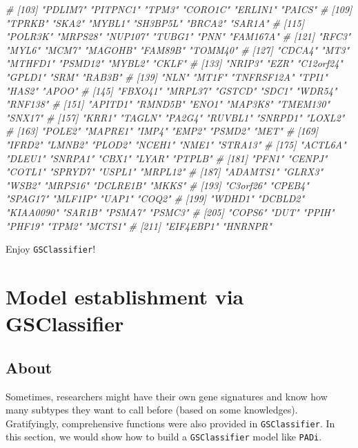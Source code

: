 \documentclass[
  12pt,
]{book}
\newenvironment{Shaded}{\begin{snugshade}}{\end{snugshade}}
\newcommand{\CommentTok}[1]{\textcolor[rgb]{0.56,0.35,0.01}{\textit{#1}}}
\begin{document}
\begin{Shaded}
\begin{Highlighting}[]
\CommentTok{\# [103] "PDLIM7"    "PITPNC1"   "TPM3"      "CORO1C"    "ERLIN1"    "PAICS"    }
\CommentTok{\# [109] "TPRKB"     "SKA2"      "MYBL1"     "SH3BP5L"   "BRCA2"     "SAR1A"    }
\CommentTok{\# [115] "POLR3K"    "MRPS28"    "NUP107"    "TUBG1"     "PNN"       "FAM167A"  }
\CommentTok{\# [121] "RFC3"      "MYL6"      "MCM7"      "MAGOHB"    "FAM89B"    "TOMM40"   }
\CommentTok{\# [127] "CDCA4"     "MT3"       "MTHFD1"    "PSMD12"    "MYBL2"     "CKLF"     }
\CommentTok{\# [133] "NRIP3"     "EZR"       "C12orf24"  "GPLD1"     "SRM"       "RAB3B"    }
\CommentTok{\# [139] "NLN"       "MT1F"      "TNFRSF12A" "TPI1"      "HAS2"      "APOO"     }
\CommentTok{\# [145] "FBXO41"    "MRPL37"    "GSTCD"     "SDC1"      "WDR54"     "RNF138"   }
\CommentTok{\# [151] "APITD1"    "RMND5B"    "ENO1"      "MAP3K8"    "TMEM130"   "SNX17"    }
\CommentTok{\# [157] "KRR1"      "TAGLN"     "PA2G4"     "RUVBL1"    "SNRPD1"    "LOXL2"    }
\CommentTok{\# [163] "POLE2"     "MAPRE1"    "IMP4"      "EMP2"      "PSMD2"     "MET"      }
\CommentTok{\# [169] "IFRD2"     "LMNB2"     "PLOD2"     "NCEH1"     "NME1"      "STRA13"   }
\CommentTok{\# [175] "ACTL6A"    "DLEU1"     "SNRPA1"    "CBX1"      "LYAR"      "PTPLB"    }
\CommentTok{\# [181] "PFN1"      "CENPJ"     "COTL1"     "SPRYD7"    "USPL1"     "MRPL12"   }
\CommentTok{\# [187] "ADAMTS1"   "GLRX3"     "WSB2"      "MRPS16"    "DCLRE1B"   "MKKS"     }
\CommentTok{\# [193] "C3orf26"   "CPEB4"     "SPAG17"    "MLF1IP"    "UAP1"      "COQ2"     }
\CommentTok{\# [199] "WDHD1"     "DCBLD2"    "KIAA0090"  "SAR1B"     "PSMA7"     "PSMC3"    }
\CommentTok{\# [205] "COPS6"     "DUT"       "PPIH"      "PHF19"     "TPM2"      "MCTS1"    }
\CommentTok{\# [211] "EIF4EBP1"  "HNRNPR"}
\end{Highlighting}
\end{Shaded}

Enjoy \texttt{GSClassifier}!

\hypertarget{model-establishment-via-gsclassifier}{%
\chapter{Model establishment via GSClassifier}\label{model-establishment-via-gsclassifier}}

\hypertarget{about-1}{%
\section{About}\label{about-1}}

Sometimes, researchers might have their own gene signatures and know how many subtypes they want to call before (based on some knowledges). Gratifyingly, comprehensive functions were also provided in \texttt{GSClassifier}. In this section, we would show how to build a \texttt{GSClassifier} model like \texttt{PADi}.
\end{document}
